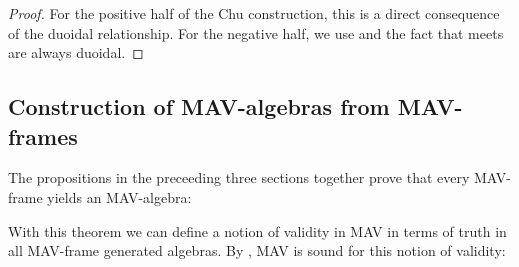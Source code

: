 \begin{proof}
  For the positive half of the Chu construction, this is a direct
  consequence of the duoidal relationship. For the negative half, we
  use  and the fact that meets are
  always duoidal.
\end{proof}

\subsection{Construction of MAV-algebras from MAV-frames}

The propositions in the preceeding three sections together prove that
every MAV-frame yields an MAV-algebra:


With this theorem we can define a notion of validity in MAV in terms
of truth in all MAV-frame generated algebras. By ,
MAV is sound for this notion of validity:

